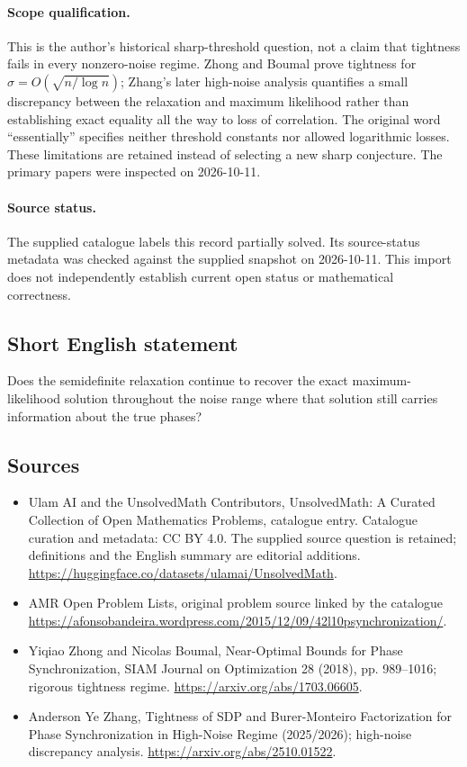 \documentclass[11pt]{article}
\begin{document}
\paragraph{Scope qualification.}
This is the author's historical sharp-threshold question, not a claim that tightness fails in every nonzero-noise regime. Zhong and Boumal prove tightness for $\sigma=O(\sqrt{n/\log n})$; Zhang's later high-noise analysis quantifies a small discrepancy between the relaxation and maximum likelihood rather than establishing exact equality all the way to loss of correlation. The original word ``essentially'' specifies neither threshold constants nor allowed logarithmic losses. These limitations are retained instead of selecting a new sharp conjecture. The primary papers were inspected on 2026-10-11.
\paragraph{Source status.}
The supplied catalogue labels this record partially solved. Its source-status metadata was checked against the supplied snapshot on 2026-10-11. This import does not independently establish current open status or mathematical correctness.
\subsection{Short English statement}
Does the semidefinite relaxation continue to recover the exact maximum-likelihood solution throughout the noise range where that solution still carries information about the true phases?
\subsection{Sources}
\begin{itemize}
\item[S1] Ulam AI and the UnsolvedMath Contributors, UnsolvedMath: A Curated Collection of Open Mathematics Problems, catalogue entry. Catalogue curation and metadata: CC BY 4.0. The supplied source question is retained; definitions and the English summary are editorial additions.
\url{https://huggingface.co/datasets/ulamai/UnsolvedMath}.
\item[S2] AMR Open Problem Lists, original problem source linked by the catalogue
\url{https://afonsobandeira.wordpress.com/2015/12/09/42l10psynchronization/}.
\item[S3] Yiqiao Zhong and Nicolas Boumal, Near-Optimal Bounds for Phase Synchronization, SIAM Journal on Optimization 28 (2018), pp. 989--1016; rigorous tightness regime.
\url{https://arxiv.org/abs/1703.06605}.
\item[S4] Anderson Ye Zhang, Tightness of SDP and Burer-Monteiro Factorization for Phase Synchronization in High-Noise Regime (2025/2026); high-noise discrepancy analysis.
\url{https://arxiv.org/abs/2510.01522}.
\end{itemize}
\end{document}
